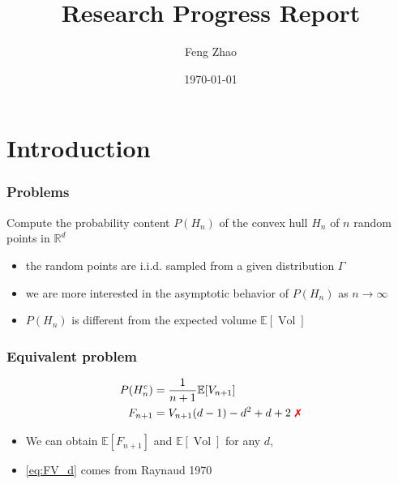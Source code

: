 \documentclass{beamer}
\title{Research Progress Report}
\author{Feng Zhao}
\date{\today}
\DeclareMathOperator{\Vol}{Vol}
\begin{document}
\begin{frame}
	\titlepage
\end{frame}


\section{Introduction}

\begin{frame}
\frametitle{Problems}
Compute the probability content $P(H_n)$ of the convex hull $H_n$
of $n$ random points in $\mathbb{R}^d$
\begin{itemize}
\item the random points are i.i.d. sampled from a given distribution $\Gamma$
\item we are more interested in the asymptotic behavior of $P(H_n)$
as $n\to\infty$
\item $P(H_n)$ is different from the expected volume $\mathbb{E}[\Vol]$
\end{itemize}
\end{frame}
\begin{frame}
	\frametitle{Equivalent problem}
    \begin{align}
        P(H_n^c) & = \frac{1}{n+1}\mathbb{E}[V_{n+1}]\\
        F_{n+1} & = V_{n+1} (d-1) - d^2 + d + 2 \textrm{ \textcolor{red}{\ding{55}}}
        \label{eq:FV_d}
    \end{align}   
    \begin{itemize}
    \item We can obtain
    $\mathbb{E}[F_{n+1}]$ and $\mathbb{E}[\Vol]$ for any $d$, 
    \item \eqref{eq:FV_d} comes from Raynaud 1970
    \end{itemize}
\end{frame}   
\end{document}

